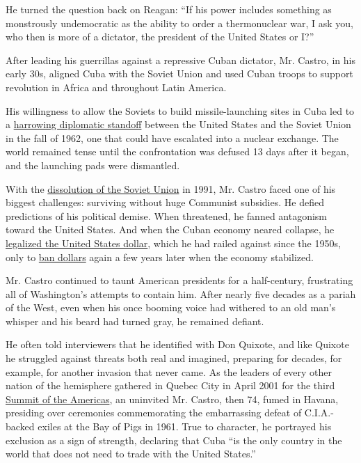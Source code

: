 He turned the question back on Reagan: ``If his power includes something
as monstrously undemocratic as the ability to order a thermonuclear war,
I ask you, who then is more of a dictator, the president of the United
States or I?''

After leading his guerrillas against a repressive Cuban dictator, Mr.
Castro, in his early 30s, aligned Cuba with the Soviet Union and used
Cuban troops to support revolution in Africa and throughout Latin
America.

His willingness to allow the Soviets to build missile-launching sites in
Cuba led to a
\href{http://topics.nytimes.com/top/reference/timestopics/subjects/c/cuban_missile_crisis/index.html}{harrowing
diplomatic standoff} between the United States and the Soviet Union in
the fall of 1962, one that could have escalated into a nuclear exchange.
The world remained tense until the confrontation was defused 13 days
after it began, and the launching pads were dismantled.

With the
\href{http://www.nytimes.com/1991/09/06/world/soviet-turmoil-soviet-congress-yields-rule-republics-avoid-political-economic.html}{dissolution
of the Soviet Union} in 1991, Mr. Castro faced one of his biggest
challenges: surviving without huge Communist subsidies. He defied
predictions of his political demise. When threatened, he fanned
antagonism toward the United States. And when the Cuban economy neared
collapse, he
\href{http://www.nytimes.com/1994/08/28/world/flight-from-cuba-in-havana-dollars-define-cuba-s-haves-and-have-nots.html}{legalized
the United States dollar}, which he had railed against since the 1950s,
only to
\href{http://www.nytimes.com/2004/11/28/international/americas/28cuba.html}{ban
dollars} again a few years later when the economy stabilized.

Mr. Castro continued to taunt American presidents for a half-century,
frustrating all of Washington's attempts to contain him. After nearly
five decades as a pariah of the West, even when his once booming voice
had withered to an old man's whisper and his beard had turned gray, he
remained defiant.

He often told interviewers that he identified with Don Quixote, and like
Quixote he struggled against threats both real and imagined, preparing
for decades, for example, for another invasion that never came. As the
leaders of every other nation of the hemisphere gathered in Quebec City
in April 2001 for the third
\href{http://www.nytimes.com/2001/04/23/world/talks-tie-trade-in-the-americas-to-democracy.html}{Summit
of the Americas}, an uninvited Mr. Castro, then 74, fumed in Havana,
presiding over ceremonies commemorating the embarrassing defeat of
C.I.A.-backed exiles at the Bay of Pigs in 1961. True to character, he
portrayed his exclusion as a sign of strength, declaring that Cuba ``is
the only country in the world that does not need to trade with the
United States.''

